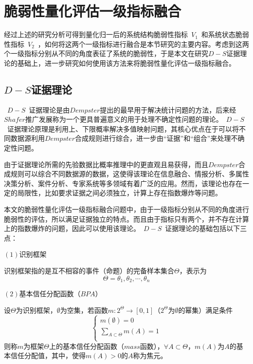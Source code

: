\section{脆弱性量化评估一级指标融合}
\label{sec:quanIndex}
经过上述的研究分析可得到量化归一后的系统结构脆弱性指标~$V_1$~和系统状态脆弱性指标~$V_2$~，如何将这两个一级指标进行融合是本节研究的主要内容。考虑到这两个一级指标分别从不同的角度表征了系统的脆弱性，于是本文在研究$D-S$证据理论的基础上，进一步研究如何使用该方法来将脆弱性量化评估一级指标融合。

\subsection{$D-S$证据理论}
\label{sec:DStheory}
~$D-S$~证据理论是由$Dempster$提出的最早用于解决统计问题的方法，后来经$Shafer$推广发展称为一个更具普遍意义的用于处理不确定性问题的理论。~$D-S$~证据理论原理是利用上、下限概率解决多值映射问题，其核心优点在于可以将不同数据源利用$Dempster$合成规则进行综合，进一步由“证据”和“组合”来处理不确定性问题。

由于证据理论所需的先验数据比概率推理中的更直观且易获得，而且$Dempster$合成规则可以综合不同数据源的数据，这使得该理论在信息融合、情报分析、多属性决策分析、案件分析、专家系统等多领域有着广泛的应用\cite{DS1,DS2,DS3}。然而，该理论也存在一定的局限性，比如要求证据之间必须独立，计算上存在指数爆炸等问题。

本文的脆弱性量化评估一级指标融合问题中，由于一级指标分别从不同的角度进行脆弱性的评估，所以满足证据独立的特点。而且由于指标只有两个，并不存在计算上的指数爆炸的问题，因此可以使用该理论。~$D-S$~证据理论的基础包括以下三点：

$(1)$识别框架

识别框架指的是互不相容的事件（命题）的完备样本集合$\Theta$，表示为
\begin{equation}\label{equ:chap4:Index21}
\Theta={\theta_1,\theta_2,\cdots,\theta_n}
\end{equation}

$(2)$基本信任分配函数（$BPA$）

设$\Theta$为识别框架，$\emptyset$为空集，若函数$m:2^{\Theta}\to[0,1]$（$2^{\Theta}$为$\emptyset$的幂集）满足条件
\begin{equation}\label{equ:chap4:Index22}
\left\{\begin{array}{l}
        m(\emptyset)=0\\
        \sum_{A\subset\Theta}m(A)=1\\
\end{array}\right.
\end{equation}
则称$m$为框架$\Theta$上的基本信任分配函数（$mass$函数），$\forall A\subset\Theta$，$m(A)$为$A$的基本信任分配值，其中，使得$m(A)>0$的$A$称为焦元。

